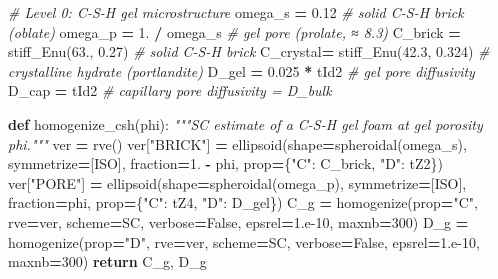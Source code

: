 \documentclass[
  a4paper,
  numbers=noendperiod,
  DIV=12]{scrreprt}
\newenvironment{Shaded}{\begin{snugshade}}{\end{snugshade}}
\newcommand{\CommentTok}[1]{\textcolor[rgb]{0.56,0.35,0.01}{\textit{#1}}}
\newcommand{\ControlFlowTok}[1]{\textcolor[rgb]{0.13,0.29,0.53}{\textbf{#1}}}
\newcommand{\DecValTok}[1]{\textcolor[rgb]{0.00,0.00,0.81}{#1}}
\newcommand{\FloatTok}[1]{\textcolor[rgb]{0.00,0.00,0.81}{#1}}
\newcommand{\KeywordTok}[1]{\textcolor[rgb]{0.13,0.29,0.53}{\textbf{#1}}}
\newcommand{\NormalTok}[1]{#1}
\newcommand{\OperatorTok}[1]{\textcolor[rgb]{0.81,0.36,0.00}{\textbf{#1}}}
\newcommand{\StringTok}[1]{\textcolor[rgb]{0.31,0.60,0.02}{#1}}
\newcommand{\VariableTok}[1]{\textcolor[rgb]{0.00,0.00,0.00}{#1}}
\begin{document}
\begin{Shaded}
\begin{Highlighting}[]
\CommentTok{\# Level 0: C{-}S{-}H gel microstructure}
\NormalTok{omega\_s }\OperatorTok{=} \FloatTok{0.12}          \CommentTok{\# solid C{-}S{-}H brick (oblate)}
\NormalTok{omega\_p }\OperatorTok{=} \FloatTok{1.} \OperatorTok{/}\NormalTok{ omega\_s  }\CommentTok{\# gel pore (prolate, ≈ 8.3)}
\NormalTok{C\_brick  }\OperatorTok{=}\NormalTok{ stiff\_Enu(}\FloatTok{63.}\NormalTok{, }\FloatTok{0.27}\NormalTok{)    }\CommentTok{\# solid C{-}S{-}H brick}
\NormalTok{C\_crystal}\OperatorTok{=}\NormalTok{ stiff\_Enu(}\FloatTok{42.3}\NormalTok{, }\FloatTok{0.324}\NormalTok{)  }\CommentTok{\# crystalline hydrate (portlandite)}
\NormalTok{D\_gel    }\OperatorTok{=} \FloatTok{0.025} \OperatorTok{*}\NormalTok{ tId2            }\CommentTok{\# gel pore diffusivity}
\NormalTok{D\_cap    }\OperatorTok{=}\NormalTok{ tId2                    }\CommentTok{\# capillary pore diffusivity = D\_bulk}

\KeywordTok{def}\NormalTok{ homogenize\_csh(phi):}
    \CommentTok{"""SC estimate of a C{-}S{-}H gel foam at gel porosity phi."""}
\NormalTok{    ver }\OperatorTok{=}\NormalTok{ rve()}
\NormalTok{    ver[}\StringTok{"BRICK"}\NormalTok{] }\OperatorTok{=}\NormalTok{ ellipsoid(shape}\OperatorTok{=}\NormalTok{spheroidal(omega\_s), symmetrize}\OperatorTok{=}\NormalTok{[ISO],}
\NormalTok{                             fraction}\OperatorTok{=}\FloatTok{1.} \OperatorTok{{-}}\NormalTok{ phi, prop}\OperatorTok{=}\NormalTok{\{}\StringTok{"C"}\NormalTok{: C\_brick, }\StringTok{"D"}\NormalTok{: tZ2\})}
\NormalTok{    ver[}\StringTok{"PORE"}\NormalTok{]  }\OperatorTok{=}\NormalTok{ ellipsoid(shape}\OperatorTok{=}\NormalTok{spheroidal(omega\_p), symmetrize}\OperatorTok{=}\NormalTok{[ISO],}
\NormalTok{                             fraction}\OperatorTok{=}\NormalTok{phi,     prop}\OperatorTok{=}\NormalTok{\{}\StringTok{"C"}\NormalTok{: tZ4,    }\StringTok{"D"}\NormalTok{: D\_gel\})}
\NormalTok{    C\_g }\OperatorTok{=}\NormalTok{ homogenize(prop}\OperatorTok{=}\StringTok{"C"}\NormalTok{, rve}\OperatorTok{=}\NormalTok{ver, scheme}\OperatorTok{=}\NormalTok{SC, verbose}\OperatorTok{=}\VariableTok{False}\NormalTok{,}
\NormalTok{                     epsrel}\OperatorTok{=}\FloatTok{1.e{-}10}\NormalTok{, maxnb}\OperatorTok{=}\DecValTok{300}\NormalTok{)}
\NormalTok{    D\_g }\OperatorTok{=}\NormalTok{ homogenize(prop}\OperatorTok{=}\StringTok{"D"}\NormalTok{, rve}\OperatorTok{=}\NormalTok{ver, scheme}\OperatorTok{=}\NormalTok{SC, verbose}\OperatorTok{=}\VariableTok{False}\NormalTok{,}
\NormalTok{                     epsrel}\OperatorTok{=}\FloatTok{1.e{-}10}\NormalTok{, maxnb}\OperatorTok{=}\DecValTok{300}\NormalTok{)}
    \ControlFlowTok{return}\NormalTok{ C\_g, D\_g}


\end{Highlighting}
\end{Shaded}
\end{document}
